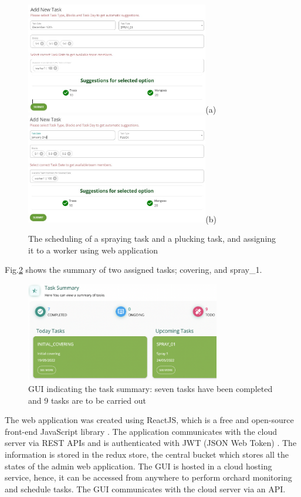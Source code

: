 \documentclass[journal]{IEEEtran}
\begin{document}
\begin{figure}[h]
	\centering
	\includegraphics[width = 8cm]{graphics/1a.jpg}(a)\\
	\includegraphics[width = 8cm]{graphics/1b.jpg}(b)
	\caption{The scheduling of a spraying task and a plucking task, and assigning it to a worker using web application}
	\label{fig_1}
\end{figure}\par
Fig.\ref{fig_GUI} shows the summary of two assigned tasks; covering, and spray\_1.
\begin{figure}[htb]
	\centering
	\includegraphics[width = 8.5cm]{graphics/GUI.png}
	\caption{GUI indicating the task summary: seven tasks have been completed and 9 tasks are to be carried out}
	\label{fig_GUI}
\end{figure}
The web application was created using ReactJS, which is a free and open-source front-end JavaScript library \cite{webVsDesk}. The application communicates with the cloud server via REST APIs and is authenticated with JWT (JSON Web Token) \cite{jones2015json}. The information is stored in the redux store, the central bucket which stores all the states of the admin web application. 
The GUI is hosted in a cloud hosting service, hence, it can be accessed from anywhere to perform orchard monitoring and schedule tasks. The GUI communicates with the cloud server via an API.
\end{document}

